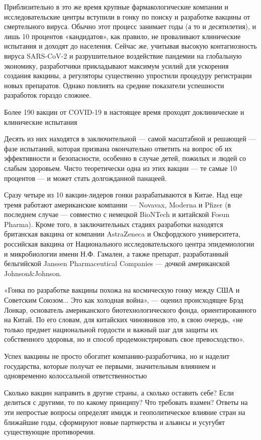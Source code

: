 Приблизительно в это же время крупные фармакологические компании и
исследовательские центры вступили в гонку по поиску и разработке вакцины от
смертельного вируса. Обычно этот процесс занимает годы (а то и десятилетия), и
лишь 10 процентов «кандидатов», как правило, не проваливают клинические
испытания и доходят до населения. Сейчас же, учитывая высокую контагиозность
вируса SARS-CoV-2 и разрушительное воздействие пандемии на глобальную
экономику, разработчики прикладывают максимум усилий для ускорения создания
вакцины, а регуляторы существенно упростили процедуру регистрации новых
препаратов. Однако повлиять на средние показатели успешности разработок гораздо
сложнее.

Более 190 вакцин от COVID-19 в настоящее время проходят доклинические и
клинические испытания

Десять из них находятся в заключительной — самой масштабной и решающей — фазе
испытаний, которая призвана окончательно ответить на вопрос об их эффективности
и безопасности, особенно в случае детей, пожилых и людей со слабым здоровьем.
Чисто теоретически одна из этих вакцин — те самые 10 процентов — и может стать
долгожданной панацеей.

Сразу четыре из 10 вакцин-лидеров гонки разрабатываются в Китае. Над еще тремя
работают американские компании — Novavax, Moderna и Pfizer (в последнем случае
— совместно с немецкой BioNTech и китайской Fosun Pharma). Кроме того, в
заключительных стадиях разработки находятся британская вакцина от компании
AstraZeneca и Оксфордского университета, российская вакцина от Национального
исследовательского центра эпидемиологии и микробиологии имени Н.Ф. Гамалеи, а
также препарат, разработанный бельгийской Janssen Pharmaceutical Companies —
дочкой американской Johnson\&Johnson.

«Гонка по разработке вакцины похожа на космическую гонку между США и Советским
Союзом... Это как холодная война», — оценил происходящее Брэд Лонкар,
основатель американского биотехнологического фонда, ориентированного на Китай.
По его словам, для китайских чиновников это, в свою очередь, «не только предмет
национальной гордости и важный шаг для защиты их собственного здоровья, но и
способ продемонстрировать свое превосходство».

Успех вакцины не просто обогатит компанию-разработчика, но и наделит
государства, которые получат ее первыми, значительным влиянием и одновременно
колоссальной ответственностью

Сколько вакцин направить в другие страны, а сколько оставить себе? Если
делиться с другими, то по какому принципу? Что требовать взамен? Ответы на эти
непростые вопросы определят имидж и геополитическое влияние стран на ближайшие
годы, сформируют новые партнерства и альянсы и усугубят существующие
противоречия.

